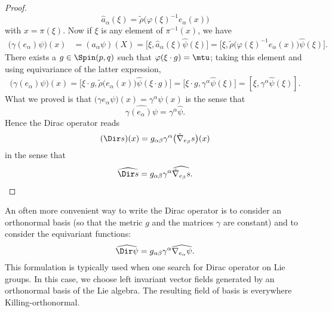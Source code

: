 \begin{proof}
	\[
		\hat a_{\alpha}(\xi)=\tilde\rho\big( \varphi(\xi)^{-1}e_{\alpha}(x) \big)
	\]
	with $x=\pi(\xi)$. Now if $\xi$ is any element of $\pi^{-1}(x)$, we have
	\begin{align*}
		\big( \gamma(e_{\alpha})\psi \big)(x) & =(a_{\alpha}\psi)(X)=\big[ \xi,\hat a_{\alpha}(\xi)\hat\psi(\xi) \big]
		=\big[ \xi,\tilde\rho\big( \varphi(\xi)^{-1}e_{\alpha}(x) \big)\hat{\psi}(\xi) \big].
	\end{align*}
	There exists a $g\in\Spin(p,q)$ such that $\varphi(\xi\cdot g)=\mtu$; taking this element and using equivariance of the latter expression,
	\begin{align}
		\big( \gamma(e_{\alpha})\psi \big)(x)=\big[ \xi\cdot g,\tilde\rho\big( e_{\alpha}(x) \big)\hat{\psi}(\xi\cdot g) \big]
		=\big[ \xi\cdot g,\gamma^{\alpha}\hat{\psi}(\xi) \big]
		=[\xi,\gamma^{\alpha}\hat{\psi}(\xi)].
	\end{align}
	What we proved is that $\big( \gamma e_{\alpha}\psi \big)(x)=\gamma^{\alpha}\psi(x)$ is the sense that
	\begin{equation}
		\widehat{\gamma(e_{\alpha})\psi}=\gamma^{\alpha}\hat{\psi}.
	\end{equation}
	Hence the Dirac operator reads
	\[
		(\Dir s)(x)=g_{\alpha\beta}\gamma^{\alpha}\big( \tilde\nabla_{e_{\beta}}s \big)(x)
	\]
	in the sense that
	\begin{equation}
		\widehat{\Dir s}=g_{\alpha\beta}\gamma^{\alpha}\widehat{  \tilde\nabla_{e_{\beta}}s }.
	\end{equation}

\end{proof}


An often more convenient way to write the Dirac operator is to consider an orthonormal basis (so that the metric $g$ and the matrices $\gamma$ are constant) and to consider the equivariant functions:
\[
	\widehat{\Dir\psi}=g_{\alpha\beta}\gamma^{\alpha}\widehat{\nabla_{e_{\alpha}}\psi}.
\]
This formulation is typically used when one search for Dirac operator on Lie groups. In this case, we choose left invariant vector fields generated by an orthonormal basis of the Lie algebra. The resulting field of basis is everywhere Killing-orthonormal.

